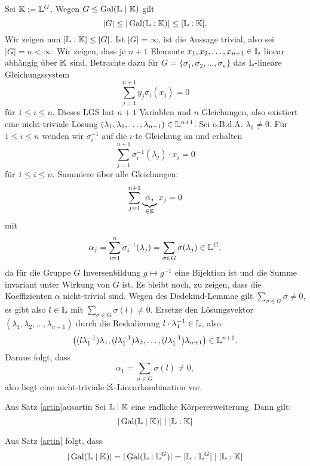 \begin{beweis}
Sei $\mathbb{K} := \mathbb{L}^G$. Wegen $G \leq \operatorname{\text{Gal}}(\mathbb{L} \mid \mathbb{K})$ gilt
\begin{equation}
|G| \leq |\operatorname{\text{Gal}}(\mathbb{L} : \mathbb{K})| \leq [\mathbb{L} : \mathbb{K}].
\end{equation}
Wir zeigen nun $[\mathbb{L}:\mathbb{K}] \leq |G|$. Ist $|G|=\infty$, ist die Aussage trivial, also sei $|G|=n<\infty$. Wir zeigen, dass je $n+1$ Elemente $x_1, x_2, \dots, x_{n+1} \in \mathbb{L}$ linear abhängig über $\mathbb{K}$ sind. Betrachte dazu für $G=\{\sigma_1, \sigma_2, \dots, \sigma_n\}$ das $\mathbb{L}$-lineare Gleichungssystem
\begin{equation}
\sum_{j=1}^{n+1} y_j \sigma_i(x_j) = 0
\end{equation}
für $1 \leq i \leq n$. Dieses LGS hat $n+1$ Variablen und $n$ Gleichungen, also existiert eine nicht-triviale Lösung $(\lambda_1, \lambda_2, \dots, \lambda_{n+1}) \in \mathbb{L}^{n+1}$. Sei o.B.d.A. $\lambda_1 \neq 0$. Für $1 \leq i \leq n$ wenden wir $\sigma_i^{-1}$ auf die $i$-te Gleichung an und erhalten
\begin{equation}
\sum_{j=1}^{n+1} \sigma_i^{-1}(\lambda_j) \cdot x_j = 0
\end{equation}
für $1 \leq i \leq n$. Summiere über alle Gleichungen:
\begin{equation}
\sum_{j=1}^{n+1} \underbrace{\alpha_j}_{\in \mathbb{K}} x_j = 0
\end{equation}
mit
\begin{equation}
\alpha_j = \sum_{i=1}^n \sigma_i^{-1}(\lambda_j)=\sum_{\sigma \in G} \sigma(\lambda_j) \in \mathbb{L}^G,
\end{equation}
da für die Gruppe $G$ Inversenbildung $g \mapsto g^{-1}$ eine Bijektion ist und die Summe invariant unter Wirkung von $G$ ist. Es bleibt noch, zu zeigen, dass die Koeffizienten $\alpha$ nicht-trivial sind. Wegen des Dedekind-Lemmae gilt $\sum_{\sigma \in G} \sigma \neq 0$, es gibt also $l \in \mathbb{L}$ mit $\sum_{\sigma \in G} \sigma (l)\neq 0$. Ersetze den Lösungsvektor $(\lambda_1, \lambda_2, \dots, \lambda_{n+1})$ durch die Reskalierung $l\cdot \lambda_1^{-1} \in \mathbb{L}$, also:
\begin{equation}
\left( (l\lambda_1^{-1}) \lambda_1, (l\lambda_1^{-1}) \lambda_2, \dots, (l\lambda_1^{-1}) \lambda_{n+1} \right) \in \mathbb{L}^{n+1}.
\end{equation}
Daraus folgt, dass
\begin{equation}
\alpha_1 = \sum_{\sigma \in G} \sigma(l) \neq 0 ,
\end{equation}
also liegt eine nicht-triviale $\mathbb{K}$-Linearkombination vor.
\end{beweis}
\begin{korollar}{Aus Satz \ref{artin}}{ausartin}
Sei $\mathbb{L} \mid \mathbb{K}$ eine endliche Körpererweiterung. Dann gilt:
\begin{equation}
|\operatorname{\text{Gal}}(\mathbb{L} \mid \mathbb{K})| \mid [\mathbb{L} : \mathbb{K}]
\end{equation}
\end{korollar}
\begin{beweis}
Aus Satz \ref{artin} folgt, dass
\begin{equation}
|\operatorname{\text{Gal}}(\mathbb{L} \mid \mathbb{K})| = |\operatorname{\text{Gal}}(\mathbb{L} \mid \mathbb{L}^G)| = [\mathbb{L} : \mathbb{L}^G] \mid [\mathbb{L} : \mathbb{K}]
\end{equation}
\end{beweis}

